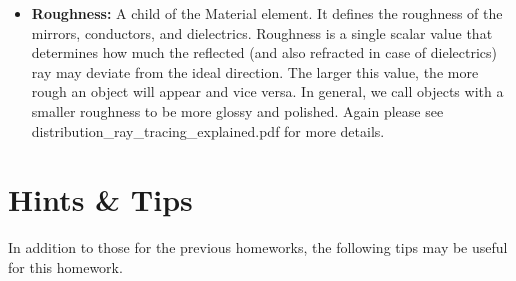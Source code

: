 \documentclass[12pt]{article}
\begin{document}
\begin{itemize}
\item \textbf{Roughness:} A child of the Material element. It defines
the roughness of the mirrors, conductors, and dielectrics. 
Roughness is a single scalar value that determines how much
the reflected (and also refracted in case of dielectrics) ray may deviate from the ideal direction. The
larger this value, the more rough an object will appear and vice
versa. In general, we call objects with a smaller roughness to be more
glossy and polished. Again please see 
distribution\_ray\_tracing\_explained.pdf for more details.

\end{itemize}

\section{Hints \& Tips}
In addition to those for the previous homeworks, the following tips may
be useful for this homework.
\end{document}
